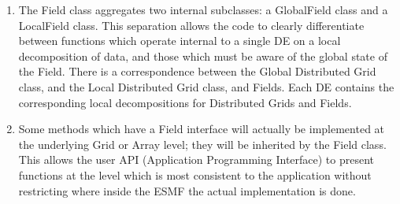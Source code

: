 

\begin{enumerate}

\item The Field class aggregates two internal subclasses: a GlobalField class
and a LocalField class.  This separation allows the code to clearly
differentiate between functions which operate internal to a single DE
on a local decomposition of data, and those which must be aware of the
global state of the Field.  There is a correspondence between the Global 
Distributed Grid class, and the Local Distributed Grid class, and Fields.  
Each DE contains the corresponding local decompositions for Distributed Grids 
and Fields.

\item Some methods which have a Field interface will actually be
implemented at the underlying Grid or Array level; they
will be inherited by the Field class.  This allows the user
API (Application Programming Interface) to present functions at
the level which is most consistent to the application without
restricting where inside the ESMF the actual implementation
is done.

\end{enumerate}